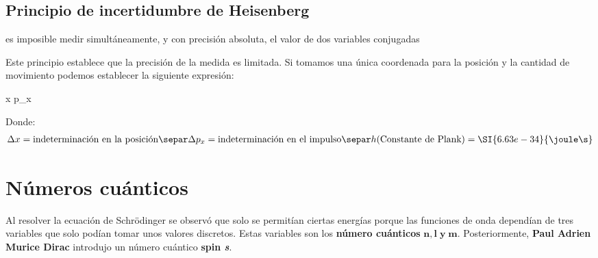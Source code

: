 \subsection{Principio de incertidumbre de Heisenberg}\label{subsec:principio-de-incertidumbre-de-heisenberg}

\begin{principio}
    es imposible medir simultáneamente, y con precisión absoluta, el valor de dos variables conjugadas
\end{principio}

Este principio establece que la precisión de la medida es limitada.
Si tomamos una única coordenada para la posición y la cantidad de movimiento podemos establecer la siguiente expresión:

\begin{centeredequation}
    \Delta x \cdot \Delta p_x \geq {} \label{eq:heisenberg}
\end{centeredequation}
Donde:
\begin{gather*}
    \Delta x = \text{indeterminación en la posición}\separ
    \Delta p_x = \text{indeterminación en el impulso}\separ
    h ( \text{Constante de Plank}) = \SI{6.63e-34}{\joule\s}
\end{gather*}


\section{Números cuánticos}\label{sec:numeros-cuanticos}

Al resolver la ecuación de Schrödinger se observó que solo se permitían ciertas energías porque las funciones de onda dependían de tres variables que solo podían tomar unos valores discretos.
Estas variables son los \textbf{número cuánticos} $\mathbf{n, l\; y\; m}$.
Posteriormente, \textbf{Paul Adrien Murice Dirac} introdujo un número cuántico \textbf{spin \textit{s}}.

